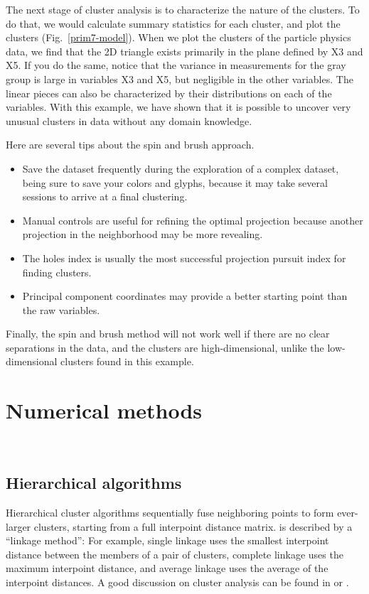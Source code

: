 The next stage of cluster analysis is to characterize the nature of
the clusters. To do that, we would calculate summary statistics for
each cluster, and plot the clusters (Fig.~\ref{prim7-model}).
When we plot the clusters of the particle physics data, we find that
the 2D triangle exists primarily in the plane defined by X3 and X5. If
you do the same, notice that the variance in measurements for the gray
group is large in variables X3 and X5, but negligible in the other
variables. The linear pieces can also be characterized by their
distributions on each of the variables.  With this example, we have
shown that it is possible to uncover very unusual clusters in data
without any domain knowledge.

Here are several tips about the spin and brush approach. 
\begin{itemize}\itemsep 0in
\item Save the
dataset frequently during the exploration of a complex dataset,
being sure to save your colors and glyphs, because it may take several
sessions to arrive at a final clustering.  
\item Manual controls are useful
for refining the optimal projection because another projection in the
neighborhood may be more revealing.  
\item The holes index is usually the
most successful projection pursuit index for finding clusters.
\item Principal component coordinates may provide a better starting point
than the raw variables.
\end{itemize}
Finally, the spin and brush method will not
work well if there are no clear separations in the data, and the
clusters are high-dimensional, unlike the low-dimensional clusters
found in this example.

\section{Numerical methods}~\label{clust-num}


\subsection{Hierarchical algorithms}


Hierarchical cluster algorithms sequentially fuse neighboring points
to form ever-larger clusters, starting from a full interpoint distance
matrix.  is described by a ``linkage
method'': For example, single linkage uses the smallest interpoint
distance between the members of a pair of clusters, complete linkage
uses the maximum interpoint distance, and average linkage uses the
average of the interpoint distances. A good discussion on cluster
analysis can be found in  or .

